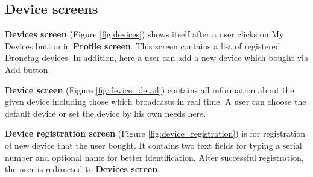 \subsection{Device screens}\label{subsec:device-screens}
\textbf{Devices screen} (Figure \ref{fig:devices}) shows itself after a user clicks on My Devices button in \textbf{Profile screen}.
This screen contains a list of registered Dronetag devices.
In addition, here a user can add a new device which bought via Add button.

\textbf{Device screen} (Figure \ref{fig:device_detail}) contains all information about the given device including those which broadcasts in real time.
A user can choose the default device or set the device by his own needs here.

\textbf{Device registration screen} (Figure \ref{fig:device_registration}) is for registration of new device that the user bought.
It contains two text fields for typing a serial number and optional name for better identification.
After successful registration, the user is redirected to \textbf{Devices screen}.


